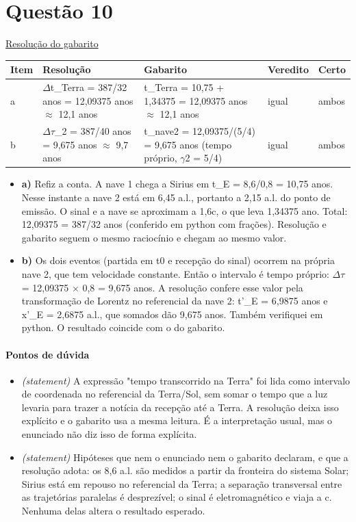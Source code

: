 \documentclass{article}%
\begin{document}
\section*{Questão 10}%
\href{https://poliedroresolve.sistemapoliedro.com.br/vestibulares/ita/2026/ita-2-fase-dia-3-30-10-2025-2-fase-dia-3/dissertativa-10-fisica-2-fase-dia-3-ita-2026}{Resolução do gabarito}\par\smallskip%
\begin{longtable}{@{}p{} p{} p{} p{} p{}@{}}\toprule Item & Resolução & Gabarito & Veredito & Certo \\ \midrule
a & $\Delta$t\_Terra = 387/32 anos = 12,09375 anos $\approx$ 12,1 anos & t\_Terra = 10,75 + 1,34375 = 12,09375 anos $\approx$ 12,1 anos & igual & ambos \\
b & $\Delta$$\tau$\_2 = 387/40 anos = 9,675 anos $\approx$ 9,7 anos & t\_nave2 = 12,09375/(5/4) = 9,675 anos (tempo próprio, $\gamma$2 = 5/4) & igual & ambos \\
\bottomrule\end{longtable}%
\begin{itemize}%
\item%
\textbf{a)} Refiz a conta. A nave 1 chega a Sirius em t\_E = 8,6/0,8 = 10,75 anos. Nesse instante a nave 2 está em 6,45 a.l., portanto a 2,15 a.l. do ponto de emissão. O sinal e a nave se aproximam a 1,6c, o que leva 1,34375 ano. Total: 12,09375 = 387/32 anos (conferido em python com frações). Resolução e gabarito seguem o mesmo raciocínio e chegam ao mesmo valor.%
\item%
\textbf{b)} Os dois eventos (partida em t0 e recepção do sinal) ocorrem na própria nave 2, que tem velocidade constante. Então o intervalo é tempo próprio: $\Delta$$\tau$ = 12,09375 $\times$ 0,8 = 9,675 anos. A resolução confere esse valor pela transformação de Lorentz no referencial da nave 2: t'\_E = 6,9875 anos e x'\_E = 2,6875 a.l., que somados dão 9,675 anos. Também verifiquei em python. O resultado coincide com o do gabarito.%
\end{itemize}%
\paragraph{Pontos de dúvida}%
\begin{itemize}%
\item%
\textit{(statement)} A expressão "tempo transcorrido na Terra" foi lida como intervalo de coordenada no referencial da Terra/Sol, sem somar o tempo que a luz levaria para trazer a notícia da recepção até a Terra. A resolução deixa isso explícito e o gabarito usa a mesma leitura. É a interpretação usual, mas o enunciado não diz isso de forma explícita.%
\item%
\textit{(statement)} Hipóteses que nem o enunciado nem o gabarito declaram, e que a resolução adota: os 8,6 a.l. são medidos a partir da fronteira do sistema Solar; Sirius está em repouso no referencial da Terra; a separação transversal entre as trajetórias paralelas é desprezível; o sinal é eletromagnético e viaja a c. Nenhuma delas altera o resultado esperado.%
\end{itemize}%
\end{document}
